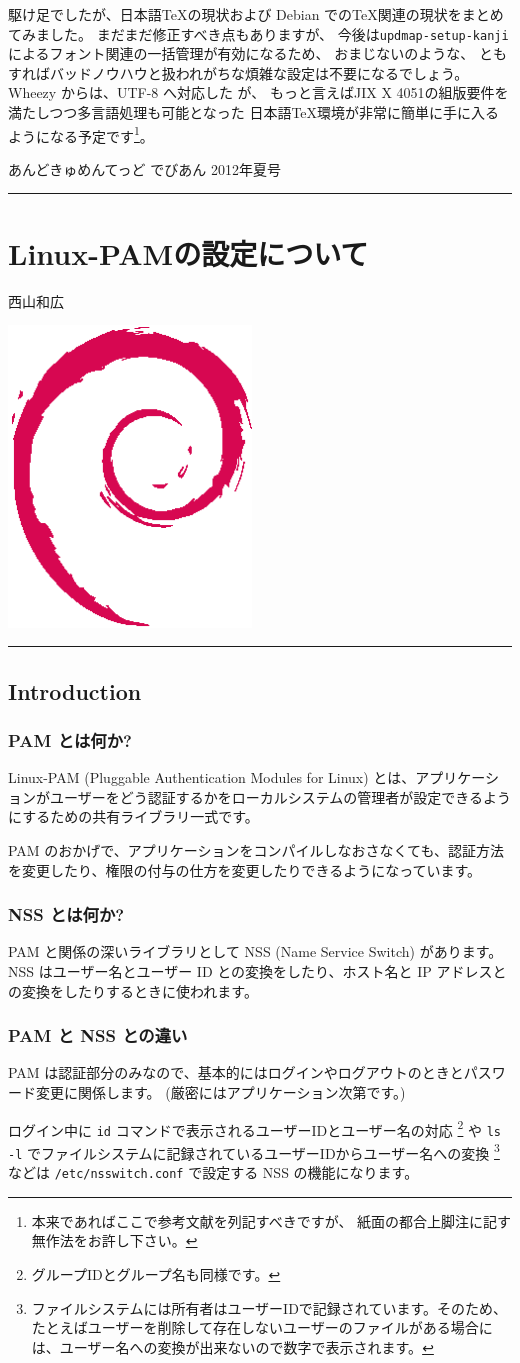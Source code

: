 \documentclass[mingoth,a4paper]{jsarticle}
\renewcommand{\dancersection}[2]{%
\newpage
あんどきゅめんてっど でびあん 2012年夏号
%
\vspace{0.1mm}\\
{\color{dancerdarkblue}\rule{\hsize}{2mm}}

%
%
\begin{minipage}[t]{0.6\hsize}
\color{dancerdarkblue}
\vspace{1cm}
\section{#1}
\hfill{}#2\\
\end{minipage}
\begin{minipage}[t]{0.4\hsize}
\vspace{-2cm}
\hfill{}\includegraphics[height=8cm]{image200502/openlogo-nd.eps}\\
\vspace{-5cm}
\end{minipage}
%
{\color{dancerlightblue}\rule{0.66\hsize}{2mm}}
%
\vspace{2cm}
}
\begin{document}
駆け足でしたが、日本語{\TeX}の現状および
Debian での{\TeX}関連の現状をまとめてみました。
%
まだまだ修正すべき点もありますが、
今後は{\tt{updmap-setup-kanji}}によるフォント関連の一括管理が有効になるため、
おまじないのような、
ともすればバッドノウハウと扱われがちな煩雑な設定は不要になるでしょう。
%
Wheezy からは、UTF-8 へ対応した \pTeX が、
もっと言えばJIX X 4051の組版要件を満たしつつ多言語処理も可能となった
日本語{\TeX}環境が非常に簡単に手に入るようになる予定です\footnote{%
  本来であればここで参考文献を列記すべきですが、
  紙面の都合上脚注に記す無作法をお許し下さい。
}。



\dancersection{Linux-PAMの設定について}{西山和広}
\label{linux-pam}
\subsection{Introduction}
\label{sec-1-1}
\subsubsection{PAM とは何か?}
\label{sec-1-1-1}

Linux-PAM (Pluggable Authentication Modules for Linux) とは、アプリケーションがユーザーをどう認証するかをローカルシステムの管理者が設定できるようにするための共有ライブラリ一式です。

PAM のおかげで、アプリケーションをコンパイルしなおさなくても、認証方法を変更したり、権限の付与の仕方を変更したりできるようになっています。
\subsubsection{NSS とは何か?}
\label{sec-1-1-2}

PAM と関係の深いライブラリとして NSS (Name Service Switch) があります。
NSS はユーザー名とユーザー ID との変換をしたり、ホスト名と IP アドレスとの変換をしたりするときに使われます。
\subsubsection{PAM と NSS との違い}
\label{sec-1-1-3}

PAM は認証部分のみなので、基本的にはログインやログアウトのときとパスワード変更に関係します。 (厳密にはアプリケーション次第です。)

ログイン中に \verb~id~ コマンドで表示されるユーザーIDとユーザー名の対応 \footnote{グループIDとグループ名も同様です。 } や \verb~ls -l~ でファイルシステムに記録されているユーザーIDからユーザー名への変換 \footnote{ファイルシステムには所有者はユーザーIDで記録されています。そのため、たとえばユーザーを削除して存在しないユーザーのファイルがある場合には、ユーザー名への変換が出来ないので数字で表示されます。 } などは \verb~/etc/nsswitch.conf~ で設定する NSS の機能になります。
\end{document}
